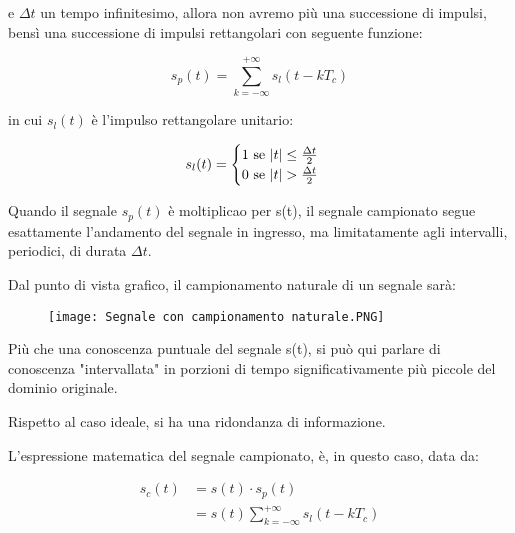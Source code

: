 e $\Delta t$ un tempo infinitesimo, allora non avremo più una successione di impulsi, bensì 
una successione di impulsi rettangolari con seguente funzione: 

{
    \Large 
    \begin{equation}
        s_p (t) 
        = 
        \sum_{k= -\infty}^{+\infty}
        s_l (t- k T_c)
    \end{equation}
}

in cui $s_l (t)$ è l'impulso rettangolare unitario: 

{
    \Large 
    \begin{equation}
        s_l (t) 
        = 
        \begin{cases}
            1 \text{ se } \abs{t} \leq \frac{\Delta t}{2} \\ 
            0 \text{ se } \abs{t} > \frac{\Delta t}{2} 
        \end{cases}
    \end{equation}
}

Quando il segnale $s_p (t)$ è moltiplicao per s(t), il segnale campionato segue esattamente l'andamento del segnale in ingresso, 
ma limitatamente agli intervalli, periodici, di durata $\Delta t$. \newline 

Dal punto di vista grafico, il campionamento naturale di un segnale sarà: 

\begin{figure}[h]
    \centering
    \texttt{[image: Segnale con campionamento naturale.PNG]}
\end{figure}  

Più che una conoscenza puntuale del segnale s(t), si può qui parlare di conoscenza "intervallata" in porzioni di tempo 
significativamente più piccole del dominio originale. \newline 

Rispetto al caso ideale, si ha una ridondanza di informazione. \newline 

L'espressione matematica del segnale campionato, è, in questo caso, data da: 

{
    \Large 
    \begin{equation}
        \begin{split}
            s_c (t)
            &= 
            s(t) \cdot s_p (t)
            \\ 
            &= s(t) \sum_{k = -\infty}^{+ \infty} s_l (t - kT_c) 
        \end{split}
    \end{equation}
}

